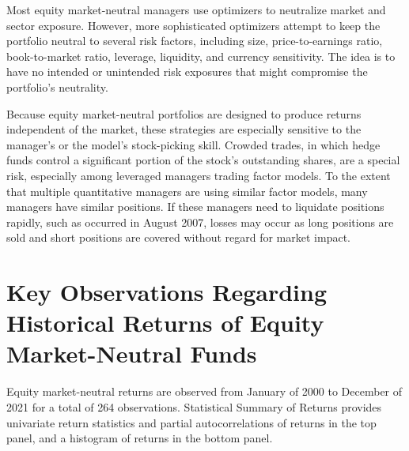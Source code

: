 \documentclass[11pt]{article}
\begin{document}
Most equity market-neutral managers use optimizers to neutralize market and sector exposure. However, more sophisticated optimizers attempt to keep the portfolio neutral to several risk factors, including size, price-to-earnings ratio, book-to-market ratio, leverage, liquidity, and currency sensitivity. The idea is to have no intended or unintended risk exposures that might compromise the portfolio's neutrality.

Because equity market-neutral portfolios are designed to produce returns independent of the market, these strategies are especially sensitive to the manager's or the model's stock-picking skill. Crowded trades, in which hedge funds control a significant portion of the stock's outstanding shares, are a special risk, especially among leveraged managers trading factor models. To the extent that multiple quantitative managers are using similar factor models, many managers have similar positions. If these managers need to liquidate positions rapidly, such as occurred in August 2007, losses may occur as long positions are sold and short positions are covered without regard for market impact.

\section*{Key Observations Regarding Historical Returns of Equity Market-Neutral Funds}
Equity market-neutral returns are observed from January of 2000 to December of 2021 for a total of 264 observations. Statistical Summary of Returns provides univariate return statistics and partial autocorrelations of returns in the top panel, and a histogram of returns in the bottom panel.
\end{document}
